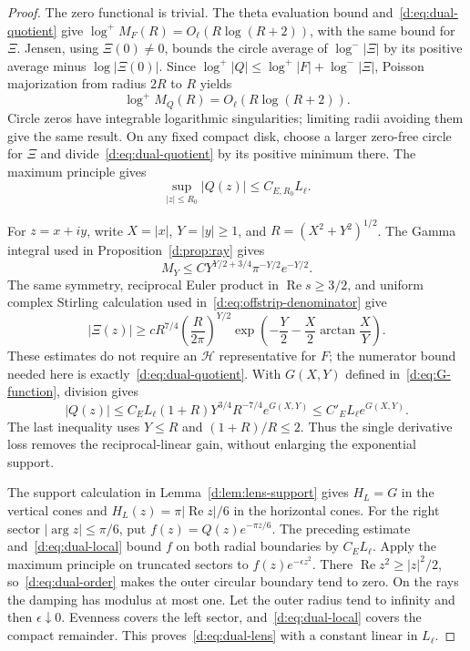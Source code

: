 \documentclass[11pt,a4paper]{article}
\numberwithin{equation}{section}
\theoremstyle{definition}\newtheorem{definition}[theorem]{Definition}
\theoremstyle{remark}\newtheorem{remark}[theorem]{Remark}
\newcommand{\Hh}{\mathcal H}\newcommand{\Hw}{\mathcal H}
\begin{document}
\begin{proof}
The zero functional is trivial. The theta evaluation bound and~\eqref{d:eq:dual-quotient} give
$\log^+M_F(R)=O_\ell(R\log(R+2))$, with the same bound for $\Xi$.
Jensen, using $\Xi(0)\ne0$, bounds the circle average of $\log^-|\Xi|$ by its positive average minus $\log|\Xi(0)|$. Since
$\log^+|Q|\le\log^+|F|+\log^-|\Xi|$, Poisson majorization from radius $2R$ to $R$ yields
\begin{equation}\label{d:eq:dual-order}
 \log^+M_Q(R)=O_\ell(R\log(R+2)).
\end{equation}
Circle zeros have integrable logarithmic singularities; limiting radii avoiding them give the same result. On any fixed compact disk, choose a larger zero-free circle for $\Xi$ and divide~\eqref{d:eq:dual-quotient} by its positive minimum there. The maximum principle gives
\begin{equation}\label{d:eq:dual-local}
 \sup_{|z|\le R_0}|Q(z)|\le C_{E,R_0}L_\ell.
\end{equation}

For $z=x+iy$, write $X=|x|$, $Y=|y|\ge1$, and $R=(X^2+Y^2)^{1/2}$. The Gamma integral used in Proposition~\ref{d:prop:ray} gives
\[
 M_Y\le C Y^{Y/2+3/4}\pi^{-Y/2}e^{-Y/2}.
\]
The same symmetry, reciprocal Euler product in $\operatorname{Re}s\ge3/2$, and uniform complex Stirling calculation used in~\eqref{d:eq:offstrip-denominator} give
\[
 |\Xi(z)|\ge cR^{7/4}\left(\frac R{2\pi}\right)^{Y/2}
       \exp\left(-\frac Y2-\frac X2\arctan\frac XY\right).
\]
These estimates do not require an $\Hh$ representative for $F$; the numerator bound needed here is exactly~\eqref{d:eq:dual-quotient}. With $G(X,Y)$ defined in~\eqref{d:eq:G-function}, division gives
\[
 |Q(z)|\le C_E L_\ell(1+R)Y^{3/4}R^{-7/4}e^{G(X,Y)}
 \le C'_E L_\ell e^{G(X,Y)}.
\]
The last inequality uses $Y\le R$ and $(1+R)/R\le2$. Thus the single derivative loss removes the reciprocal-linear gain, without enlarging the exponential support.

The support calculation in Lemma~\ref{d:lem:lens-support} gives $H_L=G$ in the vertical cones and $H_L(z)=\pi|\operatorname{Re}z|/6$ in the horizontal cones. For the right sector $|\arg z|\le\pi/6$, put $f(z)=Q(z)e^{-\pi z/6}$. The preceding estimate and~\eqref{d:eq:dual-local} bound $f$ on both radial boundaries by $C_E L_\ell$. Apply the maximum principle on truncated sectors to $f(z)e^{-\epsilon z^2}$. There $\operatorname{Re}z^2\ge|z|^2/2$, so~\eqref{d:eq:dual-order} makes the outer circular boundary tend to zero. On the rays the damping has modulus at most one. Let the outer radius tend to infinity and then $\epsilon\downarrow0$. Evenness covers the left sector, and~\eqref{d:eq:dual-local} covers the compact remainder. This proves~\eqref{d:eq:dual-lens} with a constant linear in $L_\ell$.
\end{proof}
\end{document}
